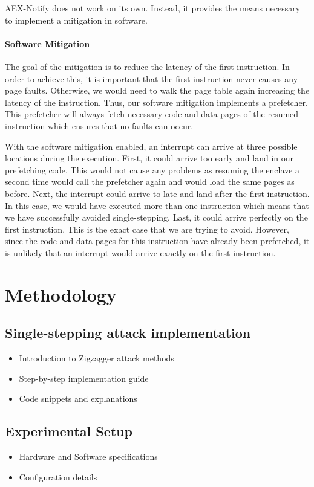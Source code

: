 \documentclass{llncs}
\begin{document}
AEX-Notify does not work on its own.
Instead, it provides the means necessary to implement a mitigation in software.

\paragraph{Software Mitigation}
The goal of the mitigation is to reduce the latency of the first instruction.
In order to achieve this, it is important that the first instruction never causes any page faults.
Otherwise, we would need to walk the page table again increasing the latency of the instruction.
Thus, our software mitigation implements a prefetcher.
This prefetcher will always fetch necessary code and data pages of the resumed
instruction which ensures that no faults can occur.

With the software mitigation enabled, an interrupt can arrive at three possible
locations during the execution.
First, it could arrive too early and land in our prefetching code.
This would not cause any problems as resuming the enclave a second time would
call the prefetcher again and would load the same pages as before.
Next, the interrupt could arrive to late and land after the first instruction.
In this case, we would have executed more than one instruction which means
that we have successfully avoided single-stepping.
Last, it could arrive perfectly on the first instruction.
This is the exact case that we are trying to avoid.
However, since the code and data pages for this instruction have already been prefetched,
it is unlikely that an interrupt would arrive exactly on the first instruction.

\section{Methodology}

\subsection{Single-stepping attack implementation}
\begin{itemize}
  \item Introduction to Zigzagger attack methods
  \item Step-by-step implementation guide
  \item Code snippets and explanations
\end{itemize}

\subsection{Experimental Setup}
\begin{itemize}
  \item Hardware and Software specifications
  \item Configuration details
\end{itemize}
\end{document}

